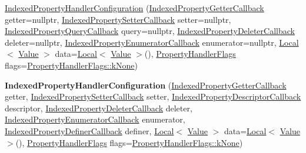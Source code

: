 \begin{DoxyCompactItemize}
\mbox{\hyperlink{structv8_1_1IndexedPropertyHandlerConfiguration_a2fb34a4a34c19fce4654c1e02151164b}{Indexed\+Property\+Handler\+Configuration}} (\mbox{\hyperlink{namespacev8_a48e7816ba64447bf32a25d194588daaf}{Indexed\+Property\+Getter\+Callback}} getter=nullptr, \mbox{\hyperlink{namespacev8_a4ac7cc6185ebc8b6a199f9fa8e6bf5c3}{Indexed\+Property\+Setter\+Callback}} setter=nullptr, \mbox{\hyperlink{namespacev8_a980b62c33eb664783e61e25c3b27f9ee}{Indexed\+Property\+Query\+Callback}} query=nullptr, \mbox{\hyperlink{namespacev8_a53863728de14cde48dd6543207b2f2da}{Indexed\+Property\+Deleter\+Callback}} deleter=nullptr, \mbox{\hyperlink{namespacev8_adbb0a6d5537371953f9ba807d4f6275e}{Indexed\+Property\+Enumerator\+Callback}} enumerator=nullptr, \mbox{\hyperlink{classv8_1_1Local}{Local}}$<$ \mbox{\hyperlink{classv8_1_1Value}{Value}} $>$ data=\mbox{\hyperlink{classv8_1_1Local}{Local}}$<$ \mbox{\hyperlink{classv8_1_1Value}{Value}} $>$(), \mbox{\hyperlink{namespacev8_af4789f0aeb8680e353901a35810cac1a}{Property\+Handler\+Flags}} flags=\mbox{\hyperlink{namespacev8_af4789f0aeb8680e353901a35810cac1aa35c3ace1970663a16e5c65baa5941b13}{Property\+Handler\+Flags\+::k\+None}})
\item 
\mbox{\label{structv8_1_1IndexedPropertyHandlerConfiguration_a52a8b33b496a43f6864d6073f4951baf}} 
{\bfseries Indexed\+Property\+Handler\+Configuration} (\mbox{\hyperlink{namespacev8_a48e7816ba64447bf32a25d194588daaf}{Indexed\+Property\+Getter\+Callback}} getter, \mbox{\hyperlink{namespacev8_a4ac7cc6185ebc8b6a199f9fa8e6bf5c3}{Indexed\+Property\+Setter\+Callback}} setter, \mbox{\hyperlink{namespacev8_a7506e91d70d885b5cbeabdf870ac0e88}{Indexed\+Property\+Descriptor\+Callback}} descriptor, \mbox{\hyperlink{namespacev8_a53863728de14cde48dd6543207b2f2da}{Indexed\+Property\+Deleter\+Callback}} deleter, \mbox{\hyperlink{namespacev8_adbb0a6d5537371953f9ba807d4f6275e}{Indexed\+Property\+Enumerator\+Callback}} enumerator, \mbox{\hyperlink{namespacev8_a967435db933fa9798caac467948499df}{Indexed\+Property\+Definer\+Callback}} definer, \mbox{\hyperlink{classv8_1_1Local}{Local}}$<$ \mbox{\hyperlink{classv8_1_1Value}{Value}} $>$ data=\mbox{\hyperlink{classv8_1_1Local}{Local}}$<$ \mbox{\hyperlink{classv8_1_1Value}{Value}} $>$(), \mbox{\hyperlink{namespacev8_af4789f0aeb8680e353901a35810cac1a}{Property\+Handler\+Flags}} flags=\mbox{\hyperlink{namespacev8_af4789f0aeb8680e353901a35810cac1aa35c3ace1970663a16e5c65baa5941b13}{Property\+Handler\+Flags\+::k\+None}})
\end{DoxyCompactItemize}

